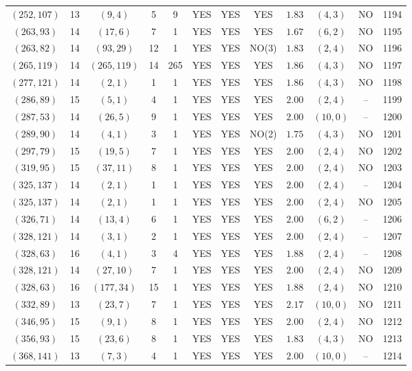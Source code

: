 \begin{longtable}{|c|c|c|c|c|c|c|c|c|c|c|c|}
$(252,107)$ & 13 & $(9,4)$ & 5 & 9 & YES & YES & YES & $1.83$ & $(4,3)$ & NO & 1194\\
$(263,93)$ & 14 & $(17,6)$ & 7 & 1 & YES & YES & YES & $1.67$ & $(6,2)$ & NO & 1195\\
$(263,82)$ & 14 & $(93,29)$ & 12 & 1 & YES & YES & NO(3) & $1.83$ & $(2,4)$ & NO & 1196\\
$(265,119)$ & 14 & $(265,119)$ & 14 & 265 & YES & YES & YES & $1.86$ & $(4,3)$ & NO & 1197\\
$(277,121)$ & 14 & $(2,1)$ & 1 & 1 & YES & YES & YES & $1.86$ & $(4,3)$ & NO & 1198\\
$(286,89)$ & 15 & $(5,1)$ & 4 & 1 & YES & YES & YES & $2.00$ & $(2,4)$ & -- & 1199\\
$(287,53)$ & 14 & $(26,5)$ & 9 & 1 & YES & YES & YES & $2.00$ & $(10,0)$ & -- & 1200\\
$(289,90)$ & 14 & $(4,1)$ & 3 & 1 & YES & YES & NO(2) & $1.75$ & $(4,3)$ & NO & 1201\\
$(297,79)$ & 15 & $(19,5)$ & 7 & 1 & YES & YES & YES & $2.00$ & $(2,4)$ & NO & 1202\\
$(319,95)$ & 15 & $(37,11)$ & 8 & 1 & YES & YES & YES & $2.00$ & $(2,4)$ & NO & 1203\\
$(325,137)$ & 14 & $(2,1)$ & 1 & 1 & YES & YES & YES & $2.00$ & $(2,4)$ & -- & 1204\\
$(325,137)$ & 14 & $(2,1)$ & 1 & 1 & YES & YES & YES & $2.00$ & $(2,4)$ & NO & 1205\\
$(326,71)$ & 14 & $(13,4)$ & 6 & 1 & YES & YES & YES & $2.00$ & $(6,2)$ & -- & 1206\\
$(328,121)$ & 14 & $(3,1)$ & 2 & 1 & YES & YES & YES & $2.00$ & $(2,4)$ & -- & 1207\\
$(328,63)$ & 16 & $(4,1)$ & 3 & 4 & YES & YES & YES & $1.88$ & $(2,4)$ & -- & 1208\\
$(328,121)$ & 14 & $(27,10)$ & 7 & 1 & YES & YES & YES & $2.00$ & $(2,4)$ & NO & 1209\\
$(328,63)$ & 16 & $(177,34)$ & 15 & 1 & YES & YES & YES & $1.88$ & $(2,4)$ & NO & 1210\\
$(332,89)$ & 13 & $(23,7)$ & 7 & 1 & YES & YES & YES & $2.17$ & $(10,0)$ & NO & 1211\\
$(346,95)$ & 15 & $(9,1)$ & 8 & 1 & YES & YES & YES & $2.00$ & $(2,4)$ & NO & 1212\\
$(356,93)$ & 15 & $(23,6)$ & 8 & 1 & YES & YES & YES & $1.83$ & $(4,3)$ & NO & 1213\\
$(368,141)$ & 13 & $(7,3)$ & 4 & 1 & YES & YES & YES & $2.00$ & $(10,0)$ & -- & 1214\\

\end{longtable}
